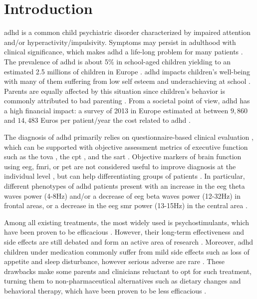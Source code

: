 

\section{Introduction} 

\gls{adhd} is a common child psychiatric disorder characterized by impaired attention and/or hyperactivity/impulsivity.
Symptoms may persist in adulthood with clinical significance, which makes \gls{adhd} a life-long problem for many
patients \citep{Faraone2006}. The prevalence of \gls{adhd} is about 5\% in school-aged children yielding to an estimated
2.5 millions of children in Europe \citep{DSM-5}. \gls{adhd} impacts children's well-being with many of them suffering
from low self esteem \citep{Shaw2005} and underachieving at school \citep{Barry2002}. Parents are equally affected by this
situation since children's behavior is commonly attributed to bad parenting \citep{Harpin2005}. From a societal point
of view, \gls{adhd} has a high financial impact: a survey of 2013 in Europe estimated at between $9,860$ and 
$14,483$ Euros per patient/year the cost related to \gls{adhd} \citep{le2014}. 
 
The diagnosis of \gls{adhd} primarily relies on questionnaire-based clinical evaluation \citep{DSM-5}, which can be
supported with objective assessment metrics of executive function such as the \gls{tova} \citep{Forbes1998}, the
\gls{cpt} \citep{Barkley1991}, and the \gls{sart} \citep{Robertson1997}. Objective markers of brain function
using \gls{eeg}, \gls{fmri}, or \gls{pet} are not considered useful to improve diagnosis at the individual
level \citep{Neba}, but can help differentiating groups of patients \citep{Johnstone2005}.  
In particular, different phenotypes of \gls{adhd} patients present with an increase in the \gls{eeg} theta waves 
power (4-8Hz) and/or a decrease of \gls{eeg} beta waves power (12-32Hz) in frontal areas, or a decrease in the \gls{eeg} 
\gls{smr} power (13-15Hz) in the central area \citep{Monastra2005, Matouvsek1984, Janzen1995, loo2017}.  
 
Among all existing treatments, the most widely used is psychostimulants, which have been proven to be efficacious
\citep{Taylor2014, Storebo2015}. However, their long-term effectiveness and side effects are still debated and form 
an active area of research \citep{DuPaul1998, Swanson2001, Jensen1999}. Moreover, \gls{adhd} children under medication 
commonly suffer from mild side effects such as loss of appetite and sleep disturbance, however serious adverse 
are rare \citep{Storebo2015, Cooper2011}. These drawbacks make some parents and clinicians reluctant to 
opt for such treatment, turning them to non-pharmaceutical alternatives such as dietary changes \citep{Belanger2009} and behavioral 
therapy, which have been proven to be less efficacious \citep{Sonuga-Barke2013}.

